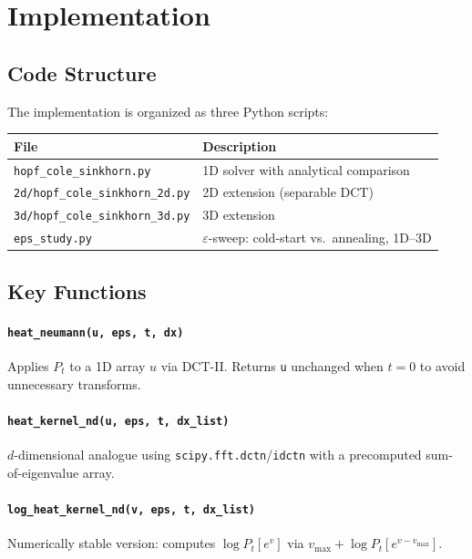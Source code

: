 \documentclass[11pt,a4paper]{article}
\newcommand{\eps}{\varepsilon}
\newcommand{\Pt}[1]{P_{#1}}   %
\begin{document}
\section{Implementation}

\subsection{Code Structure}

The implementation is organized as three Python scripts:

\begin{center}
\begin{tabular}{ll}
\toprule
\textbf{File} & \textbf{Description} \\
\midrule
\texttt{hopf\_cole\_sinkhorn.py}    & 1D solver with analytical comparison \\
\texttt{2d/hopf\_cole\_sinkhorn\_2d.py} & 2D extension (separable DCT) \\
\texttt{3d/hopf\_cole\_sinkhorn\_3d.py} & 3D extension \\
\texttt{eps\_study.py}              & $\eps$-sweep: cold-start vs.\ annealing, 1D--3D \\
\bottomrule
\end{tabular}
\end{center}

\subsection{Key Functions}

\paragraph{\texttt{heat\_neumann(u, eps, t, dx)}}
Applies $\Pt{t}$ to a 1D array $u$ via DCT-II. Returns \texttt{u} unchanged
when $t = 0$ to avoid unnecessary transforms.

\paragraph{\texttt{heat\_kernel\_nd(u, eps, t, dx\_list)}}
$d$-dimensional analogue using \texttt{scipy.fft.dctn}/\texttt{idctn} with
a precomputed sum-of-eigenvalue array.

\paragraph{\texttt{log\_heat\_kernel\_nd(v, eps, t, dx\_list)}}
Numerically stable version: computes $\log\Pt{t}[e^v]$ via
$v_{\max} + \log\Pt{t}[e^{v - v_{\max}}]$.
\end{document}
